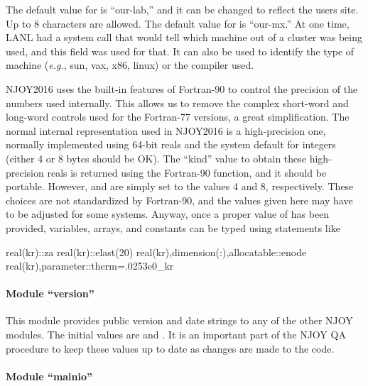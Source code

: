 The default value for  is ``our-lab,'' and it can
be changed to reflect the users site.  Up to 8 characters are
allowed.  The default value for  is ``our-mx.''  At
one time, LANL had a system call that would tell which
machine out of a cluster was being used, and this field was
used for that.  It can also be used to identify the type of
machine ({\it e.g.}, sun, vax, x86, linux) or the compiler used.

NJOY2016 uses the built-in features of Fortran-90 to control
the precision of the numbers used internally.  This allows us
to remove the complex short-word and long-word controls used for
the Fortran-77 versions, a great simplification.  The normal
internal representation used in NJOY2016 is a high-precision
one, normally implemented using 64-bit reals and the system
default for integers (either 4 or 8 bytes should be OK).
The ``kind'' value to obtain these high-precision reals is
returned using the Fortran-90  function,
and it should be portable.  However,  and  are
simply set to the values 4 and 8, respectively.  These choices are
not standardized by Fortran-90, and the values given here may
have to be adjusted for some systems.  Anyway, once a proper
value of  has been provided, variables, arrays, and
constants can be typed using statements like

\small
\begin{ccode}

    real(kr)::za
    real(kr)::elast(20)
    real(kr),dimension(:),allocatable::enode
    real(kr),parameter::therm=.0253e0_kr

\end{ccode}
\normalsize

\paragraph{Module ``version''}

This module provides public version and date strings to any of the
other NJOY modules.  The initial values are  and
.  It is an important part of the NJOY QA procedure
to keep these values up to date as changes are made to the code.

\paragraph{Module ``mainio''}

